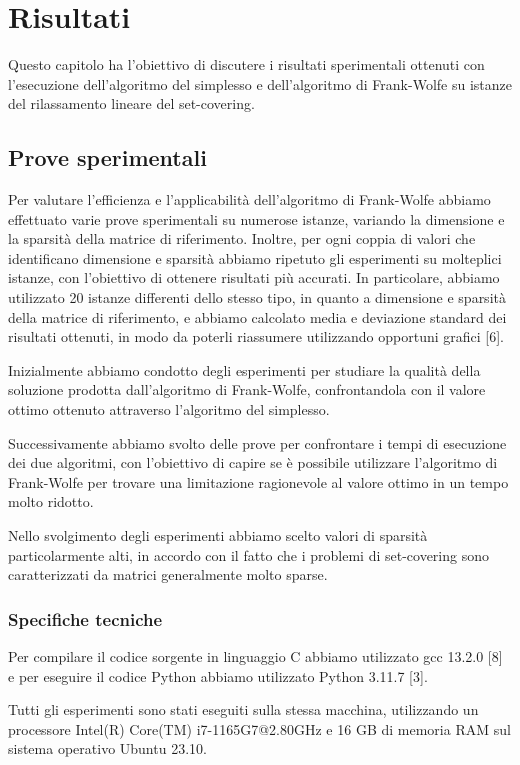 \chapter{Risultati}
Questo capitolo ha l'obiettivo di discutere i risultati sperimentali ottenuti con l'esecuzione
dell'algoritmo del simplesso e dell'algoritmo di Frank-Wolfe su istanze del rilassamento lineare del set-covering.

\section{Prove sperimentali}
Per valutare l'efficienza e l'applicabilità dell'algoritmo di Frank-Wolfe abbiamo effettuato varie prove sperimentali su
numerose istanze, variando la dimensione e la sparsità della matrice di riferimento. Inoltre, per ogni coppia di valori
che identificano dimensione e sparsità abbiamo ripetuto gli esperimenti su molteplici istanze, con l'obiettivo di
ottenere risultati più accurati. In particolare, abbiamo utilizzato 20 istanze differenti dello stesso
tipo, in quanto a dimensione e sparsità della matrice di riferimento, e abbiamo calcolato media e deviazione standard dei
risultati ottenuti, in modo da poterli riassumere utilizzando opportuni grafici [6].

Inizialmente abbiamo condotto degli esperimenti per studiare la qualità della soluzione prodotta dall'algoritmo di
Frank-Wolfe, confrontandola con il valore ottimo ottenuto attraverso l'algoritmo del simplesso.

Successivamente abbiamo svolto delle prove per confrontare i tempi di esecuzione dei due algoritmi, con l'obiettivo di
capire se è possibile utilizzare l'algoritmo di Frank-Wolfe per trovare una limitazione ragionevole al valore ottimo in
un tempo molto ridotto.

Nello svolgimento degli esperimenti abbiamo scelto valori di sparsità particolarmente alti, in accordo con il fatto che
i problemi di set-covering sono caratterizzati da matrici generalmente molto sparse.


\subsection{Specifiche tecniche}
Per compilare il codice sorgente in linguaggio C abbiamo utilizzato gcc 13.2.0 [8] e per eseguire il codice Python abbiamo
utilizzato Python 3.11.7 [3].

Tutti gli esperimenti sono stati eseguiti sulla stessa macchina, utilizzando un processore Intel(R) Core(TM)
i7-1165G7@2.80GHz e 16 GB di memoria RAM sul sistema operativo Ubuntu 23.10.

